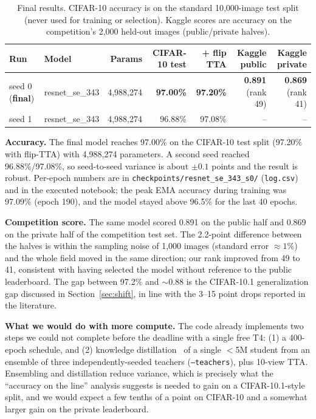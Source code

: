 \documentclass[11pt]{article}
\begin{document}
\begin{table}[h]
\centering\small
\caption{Final results. CIFAR-10 accuracy is on the standard 10{,}000-image test split (never used for training or selection). Kaggle scores are accuracy on the competition's 2{,}000 held-out images (public/private halves).}
\label{tab:results}
\footnotesize
\begin{tabular}{llrrrrr}
\toprule
Run & Model & Params & CIFAR-10 test & + flip TTA & Kaggle public & Kaggle private \\
\midrule
seed 0 (\textbf{final}) & resnet\_se\_343 & 4,988,274 & \textbf{97.00\%} & \textbf{97.20\%} & \textbf{0.891} (rank 49) & \textbf{0.869} (rank 41) \\
seed 1 & resnet\_se\_343 & 4,988,274 & 96.88\% & 97.08\% & -- & -- \\
\bottomrule
\end{tabular}
\end{table}

\textbf{Accuracy.} The final model reaches 97.00\% on the CIFAR-10 test split (97.20\% with flip-TTA) with 4{,}988{,}274 parameters. A second seed reached 96.88\%/97.08\%, so seed-to-seed variance is about $\pm0.1$ points and the result is robust. Per-epoch numbers are in \texttt{checkpoints/resnet\_se\_343\_s0/} (\texttt{log.csv}) and in the executed notebook; the peak EMA accuracy during training was 97.09\% (epoch 190), and the model stayed above 96.5\% for the last 40 epochs.

\textbf{Competition score.} The same model scored 0.891 on the public half and 0.869 on the private half of the competition test set. The 2.2-point difference between the halves is within the sampling noise of 1{,}000 images (standard error $\approx1\%$) and the whole field moved in the same direction; our rank improved from 49 to 41, consistent with having selected the model without reference to the public leaderboard. The gap between 97.2\% and $\sim$0.88 is the CIFAR-10.1 generalization gap discussed in Section~\ref{sec:shift}, in line with the 3--15 point drops reported in the literature.

\textbf{What we would do with more compute.} The code already implements two steps we could not complete before the deadline with a single free T4: (1) a 400-epoch schedule, and (2) knowledge distillation~\cite{hinton2015} of a single $<$5M student from an ensemble of three independently-seeded teachers (\texttt{--teachers}), plus 10-view TTA. Ensembling and distillation reduce variance, which is precisely what the ``accuracy on the line'' analysis suggests is needed to gain on a CIFAR-10.1-style split, and we would expect a few tenths of a point on CIFAR-10 and a somewhat larger gain on the private leaderboard.
\end{document}
